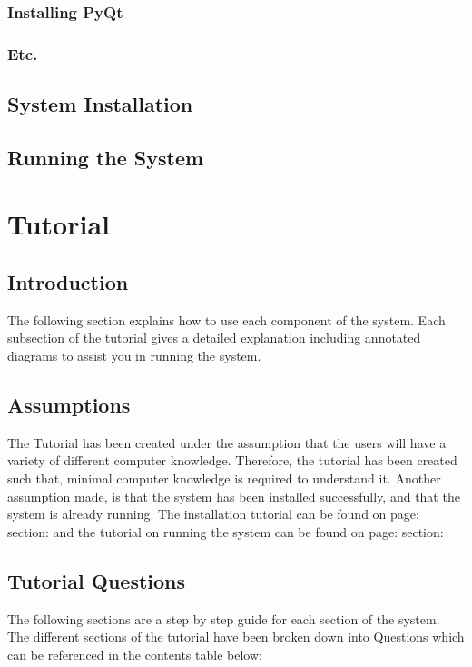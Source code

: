 \subsubsection{Installing PyQt}

\subsubsection{Etc.}

\subsection{System Installation}

\subsection{Running the System}



\section{Tutorial}

\subsection{Introduction}
The following section explains how to use each component of the system. Each subsection of the tutorial gives a detailed explanation including annotated diagrams to assist you in running the system.


\subsection{Assumptions}

The Tutorial has been created under the assumption that the users will have a variety of different computer knowledge. Therefore, the tutorial has been created such that, minimal computer knowledge is required to understand it. Another assumption made, is that the system has been installed successfully, and that the system is already running. The installation tutorial can be found on page: section: and the tutorial on running the system can be found on page: section: 

\subsection{Tutorial Questions}
The following sections are a step by step guide for each section of the system. The different sections of the tutorial have been broken down into Questions which can be referenced in the contents table below:

